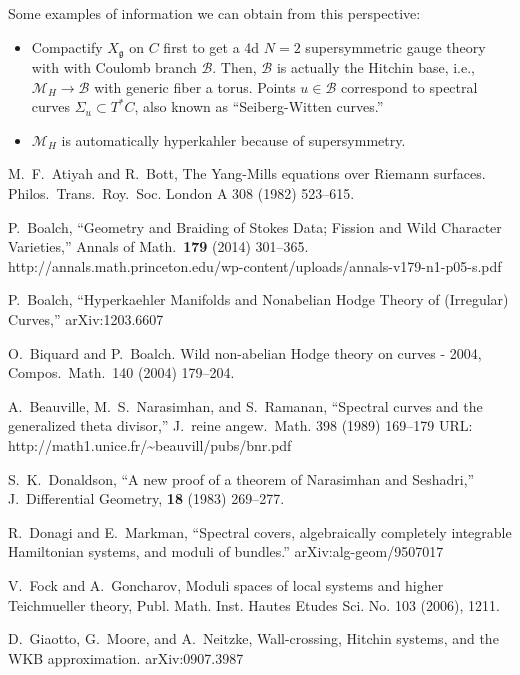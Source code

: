 \documentclass[oneside,english]{amsbook}
\numberwithin{section}{chapter}
\numberwithin{equation}{section}
\numberwithin{figure}{section}
\theoremstyle{plain}
\theoremstyle{definition}
\theoremstyle{remark}
\theoremstyle{definition}
\theoremstyle{definition}
\theoremstyle{plain}
\begin{document}
Some examples of information we can obtain from this perspective:
\begin{itemize}
\item Compactify $X_{\mathfrak{g}}$ on $C$ first to get a 4d $N=2$ supersymmetric
gauge theory with with Coulomb branch $\mathcal{B}$. Then, $\mathcal{B}$
is actually the Hitchin base, i.e., $\mathcal{M}_{H}\rightarrow\mathcal{B}$
with generic fiber a torus. Points $u\in\mathcal{B}$ correspond to
spectral curves $\Sigma_{u}\subset T^{*}C$, also known as ``Seiberg-Witten
curves.''
\item $\mathcal{M}_{H}$ is automatically hyperkahler because of supersymmetry.
\end{itemize}

\begin{thebibliography}{AB}
M.~F.~Atiyah and R.~Bott, The Yang-Mills equations
over Riemann surfaces. Philos.~Trans.~Roy.~Soc. London A 308 (1982)
523--615.

P.~Boalch, ``Geometry and Braiding of Stokes Data;
Fission and Wild Character Varieties,'' Annals of Math.~\textbf{179}
(2014) 301--365. http://annals.math.princeton.edu/wp-content/uploads/annals-v179-n1-p05-s.pdf 

P.~Boalch, ``Hyperkaehler Manifolds and Nonabelian
Hodge Theory of (Irregular) Curves,'' arXiv:1203.6607

O.~Biquard and P.~Boalch. Wild non-abelian Hodge
theory on curves - 2004, Compos.~Math.~140 (2004) 179--204.

A.~Beauville, M.~S.~Narasimhan, and S.~Ramanan,
``Spectral curves and the generalized theta divisor,'' J.~reine
angew.~Math. 398 (1989) 169--179 URL: http://math1.unice.fr/\textasciitilde{}beauvill/pubs/bnr.pdf

S.~K.~Donaldson, ``A new proof of a theorem of Narasimhan
and Seshadri,'' J.~Differential Geometry, \textbf{18} (1983) 269--277.

R.~Donagi and E.~Markman, ``Spectral covers, algebraically
completely integrable Hamiltonian systems, and moduli of bundles.''
arXiv:alg-geom/9507017

V.~Fock and A.~Goncharov, Moduli spaces of local
systems and higher Teichmueller theory, Publ. Math. Inst. Hautes Etudes
Sci. No. 103 (2006), 1\textendash{}211. 

 D.~Giaotto, G.~Moore, and A.~Neitzke, Wall-crossing,
Hitchin systems, and the WKB approximation. arXiv:0907.3987


\end{thebibliography}
\end{document}

